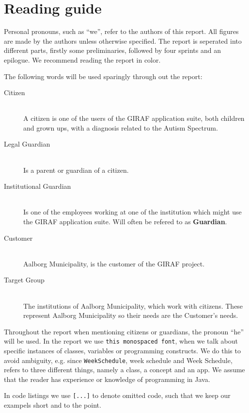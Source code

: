 \section*{Reading guide}
Personal pronouns, such as \enquote{we}, refer to the authors of this report. 
All figures are made by the authors unless otherwise specified.
The report is seperated into different parts, firstly some preliminaries, followed by four sprints and an epilogue.
We recommend reading the report in color.

The following words will be used sparingly through out the report:
\begin{description}
    \item[Citizen] \hfill\\
        A citizen is one of the users of the GIRAF application suite, both children and grown ups, with a diagnosis related to the Autism Spectrum.
	\item[Legal Guardian] \hfill\\
        Is a parent or guardian of a citizen.
    \item[Institutional Guardian] \hfill\\
        Is one of the employees working at one of the institution which might use the GIRAF application suite. Will often be refered to as \textbf{Guardian}.
	\item[Customer] \hfill\\
        Aalborg Municipality, is the customer of the GIRAF project.
	\item[Target Group] \hfill\\
        The institutions of Aalborg Municipality, which work with citizens. These represent Aalborg Municipality so their needs are the Customer's needs.
\end{description}
Throughout the report when mentioning citizens or guardians, the pronoun \enquote{he} will be used.
In the report we use \texttt{this monospaced font}, when we talk about specific instances of classes, variables or programming constructs.
We do this to avoid ambiguity, e.g. since \texttt{WeekSchedule}, week schedule and Week Schedule, refers to three different things, namely a class, a concept and an app.
We assume that the reader has experience or knowledge of programming in Java.

In code listings we use \texttt{[...]} to denote omitted code, such that we keep our exampels short and to the point.
